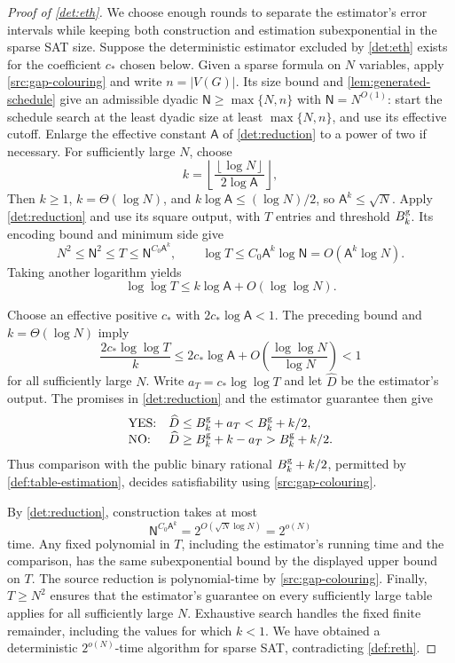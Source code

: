 \documentclass[11pt]{article} \usepackage[utf8]{inputenc}
\theoremstyle{plain} \newtheorem{theorem}{Theorem}[section]
\theoremstyle{definition} \newaliascnt{definition}{theorem}
\newcommand{\floor}[1]{\left\lfloor#1\right\rfloor}
\begin{document}
\begin{proof}[Proof of \cref{det:eth}]
We choose enough rounds to separate the estimator's error intervals while
keeping both construction and estimation subexponential in the sparse SAT size.
Suppose the deterministic estimator excluded by \cref{det:eth} exists for the
coefficient \(c_*\) chosen below. Given a sparse formula on \(N\) variables,
apply \cref{src:gap-colouring} and write \(n=|V(G)|\). Its size bound and
\cref{lem:generated-schedule} give an admissible dyadic \(\mathsf
N\ge\max\{N,n\}\) with \(\mathsf N=N^{O(1)}\): start the schedule search at the
least dyadic size at least \(\max\{N,n\}\), and use its effective cutoff.
Enlarge the effective constant \(\mathsf A\) of \cref{det:reduction} to a power
of two if necessary. For sufficiently large \(N\), choose
\[
k=\floor{\frac{\floor{\log N}}{2\log\mathsf A}},
\]
Then \(k\ge1\), \(k=\Theta(\log N)\), and \(k\log\mathsf A\le(\log N)/2\), so
\(\mathsf A^k\le\sqrt N\). Apply \cref{det:reduction} and use its square output,
with \(T\) entries and threshold \(B_k^{\rm g}\). Its encoding bound and minimum
side give
\[
N^2\le\mathsf N^2\le T\le\mathsf N^{C_0\mathsf A^k},\qquad \log T\le C_0\mathsf
A^k\log\mathsf N=O(\mathsf A^k\log N).
\]
Taking another logarithm yields
\[
\log\log T\le k\log\mathsf A+O(\log\log N).
\]

Choose an effective positive \(c_*\) with \(2c_*\log\mathsf A<1\). The preceding
bound and \(k=\Theta(\log N)\) imply
\[
\frac{2c_*\log\log T}{k} \le2c_*\log\mathsf A+O\!\left(\frac{\log\log N}{\log
N}\right)<1
\]
for all sufficiently large \(N\). Write \(a_T=c_*\log\log T\) and let \(\widehat
D\) be the estimator's output. The promises in \cref{det:reduction} and the
estimator guarantee then give
\[
\begin{array}{ll}
\text{YES:}&\widehat D\le B_k^{\rm g}+a_T<B_k^{\rm g}+k/2,\\
\text{NO:}&\widehat D\ge B_k^{\rm g}+k-a_T>B_k^{\rm g}+k/2.
\end{array}
\]
Thus comparison with the public binary rational \(B_k^{\rm g}+k/2\), permitted
by \cref{def:table-estimation}, decides satisfiability using
\cref{src:gap-colouring}.

By \cref{det:reduction}, construction takes at most
\[
\mathsf N^{C_0\mathsf A^k} =2^{O(\sqrt N\log N)}=2^{o(N)}
\]
time. Any fixed polynomial in \(T\), including the estimator's running time and
the comparison, has the same subexponential bound by the displayed upper bound
on \(T\). The source reduction is polynomial-time by \cref{src:gap-colouring}.
Finally, \(T\ge N^2\) ensures that the estimator's guarantee on every
sufficiently large table applies for all sufficiently large \(N\). Exhaustive
search handles the fixed finite remainder, including the values for which
\(k<1\). We have obtained a deterministic \(2^{o(N)}\)-time algorithm for sparse
SAT, contradicting \cref{def:reth}.
\end{proof}
\end{document}
